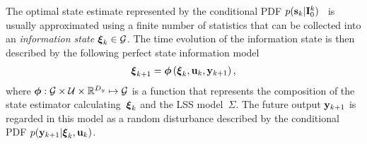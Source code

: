 \documentclass[conference,letterpaper]{IEEEtran}
\begin{document}
The optimal state estimate represented by the conditional PDF $p(\mathbf{s}_{k} \vert \mathbf{I}_{0}^{k})$~\cite{BarShalom2001:b} is usually approximated using a finite number of statistics that can be collected into an \emph{information state} $\boldsymbol{\xi}_{k}\in\mathcal{G}$. 
The time evolution of the information state is then described by the following perfect state information model
\begin{align} \label{ali:PerfectStateInformationModel}
	\boldsymbol{\xi}_{k+1} = \boldsymbol{\phi} \left(\boldsymbol{\xi}_{k},\mathbf{u}_{k},\mathbf{y}_{k+1} \right),
\end{align}
where $\boldsymbol{\phi}: \mathcal{G} \times \mathcal{U} \times \mathbb{R}^{D_y} \mapsto \mathcal{G}$ is a function that represents the composition of the state estimator calculating~$\boldsymbol{\xi}_k$ and the LSS model~$\Sigma$. 
The future output $\mathbf{y}_{k+1}$ is regarded in this model as a random disturbance described by the conditional PDF $p(\mathbf{y}_{k+1} \vert \boldsymbol{\xi}_{k},\mathbf{u}_{k})$.

\end{document}
